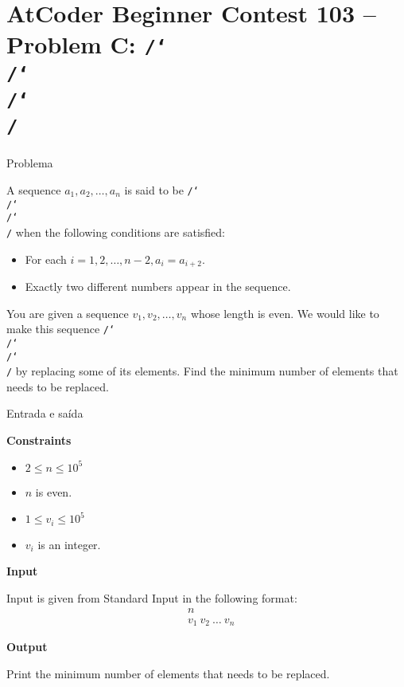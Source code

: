 \section{AtCoder Beginner Contest 103 -- Problem C: \texttt{/\char`\\/\char`\\/\char`\\/}}

\begin{frame}[fragile]{Problema}

A sequence $a_1, a_2, \ldots, a_n$ is said to be \texttt{/\char`\\/\char`\\/\char`\\/} when the 
following conditions are satisfied:

\begin{itemize}
    \item For each $i = 1, 2, \ldots, n - 2, a_i = a_{i + 2}$.
    \item Exactly two different numbers appear in the sequence.
\end{itemize}
You are given a sequence $v_1, v_2, \ldots, v_n$ whose length is even. We would like to make this 
sequence \texttt{/\char`\\/\char`\\/\char`\\/} by replacing some of its elements. Find the minimum 
number of elements that needs to be replaced.

\end{frame}

\begin{frame}[fragile]{Entrada e saída}

\textbf{Constraints}

\begin{itemize}
    \item $2\leq n\leq 10^5$
    \item $n$ is even.
    \item $1\leq v_i\leq 10^5$
    \item $v_i$ is an integer.
\end{itemize}

\textbf{Input}

Input is given from Standard Input in the following format:
\begin{align*}
&n\\
&v_1\ v_2\ \ldots\ v_n
\end{align*}

\textbf{Output}

Print the minimum number of elements that needs to be replaced.

\end{frame}

